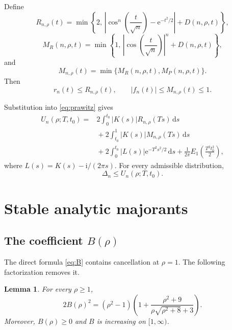 \documentclass[11pt,a4paper,twoside]{article}
\newcommand{\manualtag}[1]{\tag{#1}}
\newtheorem{lemma}[theorem]{Lemma}
\theoremstyle{remark}
\newcommand{\iu}{\mathrm{i}}
\newcommand{\e}{\mathrm{e}}
\newcommand{\dd}{\,\mathrm{d}}
\newcommand{\abs}[1]{\lvert#1\rvert}
\begin{document}
Define
\begin{equation}
 R_{n,\rho}(t)
 =
 \min\left\{
 2,\,
 \left|
 \cos^n\!\left(\frac{t}{\sqrt n}\right)-\e^{-t^2/2}
 \right|
 +D(n,\rho,t)
 \right\},
 \manualtag{14}\label{eq:R}
\end{equation}
\begin{equation}
 M_R(n,\rho,t)
 =
 \min\left\{
 1,\,
 \left|\cos\!\left(\frac{t}{\sqrt n}\right)\right|^n
 +D(n,\rho,t)
 \right\},
 \manualtag{15}\label{eq:MR}
\end{equation}
and
\begin{equation}
 M_{n,\rho}(t)
 =
 \min\{M_R(n,\rho,t),M_P(n,\rho,t)\}.
 \manualtag{16}\label{eq:M}
\end{equation}
Then
\begin{equation}
 r_n(t)\le R_{n,\rho}(t),
 \qquad
 \abs{f_n(t)}\le M_{n,\rho}(t)\le1.
 \manualtag{17}\label{eq:majorants}
\end{equation}

Substitution into \eqref{eq:prawitz} gives
\begin{equation}
\begin{aligned}
 U_n(\rho;T,t_0)
 ={}&
 2\int_0^{t_0}\abs{K(s)}R_{n,\rho}(Ts)\dd s\\
 &{}+2\int_{t_0}^{1}\abs{K(s)}M_{n,\rho}(Ts)\dd s\\
 &{}+2\int_0^{t_0}\abs{L(s)}\e^{-T^2s^2/2}\dd s
 {}+\frac1{2\pi}E_1\!\left(\frac{T^2t_0^2}{2}\right),
\end{aligned}
 \manualtag{18}\label{eq:U}
\end{equation}
where \(L(s)=K(s)-\iu/(2\pi s)\).  For every admissible
distribution,
\begin{equation}
 \Delta_n\le U_n(\rho;T,t_0).
 \manualtag{19}\label{eq:universal-U}
\end{equation}

\section{Stable analytic majorants}

\subsection{The coefficient \texorpdfstring{\(B(\rho)\)}{B(rho)}}

The direct formula \eqref{eq:B} contains cancellation at \(\rho=1\).
The following factorization removes it.

\begin{lemma}\label{lem:stable-B}
For every \(\rho\ge1\),
\begin{equation}
 2B(\rho)^2
 =
 (\rho^2-1)
 \left(
 1+\frac{\rho^2+9}{\rho\sqrt{\rho^2+8}+3}
 \right).
 \manualtag{20}\label{eq:stable-B}
\end{equation}
Moreover, \(B(\rho)\ge0\) and \(B\) is increasing on
\([1,\infty)\).
\end{lemma}
\end{document}
